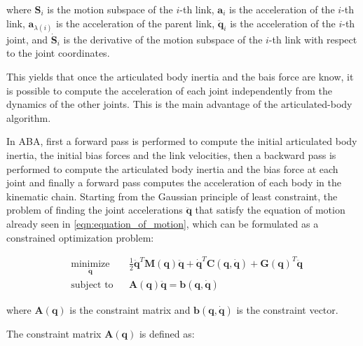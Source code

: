 where $\mathbf{S} _i$ is the motion subspace of the $i$-th link, $\mathbf{a} _i$ is the acceleration of the $i$-th link, $\mathbf{a} _{\lambda(i)}$ is the acceleration of the parent link, $\ddot{\mathbf{q}} _i$ is the acceleration of the $i$-th joint, and $\dot{\mathbf{S}} _i$ is the derivative of the motion subspace of the $i$-th link with respect to the joint coordinates.

This yields that once the articulated body inertia and the bais force are know, it is possible to compute the acceleration of each joint independently from the dynamics of the other joints. This is the main advantage of the articulated-body algorithm.

In ABA, first a forward pass is performed to compute the initial articulated body inertia, the initial bias forces and the link velocities, then a backward pass is performed to compute the articulated body inertia and the bias force at each joint and finally a forward pass computes the acceleration of each body in the kinematic chain.
Starting from the Gaussian principle of least constraint, the problem of finding the joint accelerations $\ddot{\mathbf{q}}$ that satisfy the equation of motion already seen in \cref{eqn:equation_of_motion}, which can be formulated as a constrained optimization problem:

\begin{equation}
    \begin{aligned}
         & \underset{\ddot{\mathbf{q}}}{\text{minimize}}
         &                                               & \frac{1}{2} \ddot{\mathbf{q}} ^T \mathbf{M} (\mathbf{q}) \ddot{\mathbf{q}} + \dot{\mathbf{q}} ^T \mathbf{C} (\mathbf{q}, \dot{\mathbf{q}}) + \mathbf{G} (\mathbf{q}) ^T \ddot{\mathbf{q}} \\
         & \text{subject to}
         &                                               & \mathbf{A} (\mathbf{q}) \ddot{\mathbf{q}} = \mathbf{b} (\mathbf{q}, \dot{\mathbf{q}})
    \end{aligned}
\end{equation}

where $\mathbf{A} (\mathbf{q})$ is the constraint matrix and $\mathbf{b} (\mathbf{q}, \dot{\mathbf{q}})$ is the constraint vector.

The constraint matrix $\mathbf{A} (\mathbf{q})$ is defined as:

